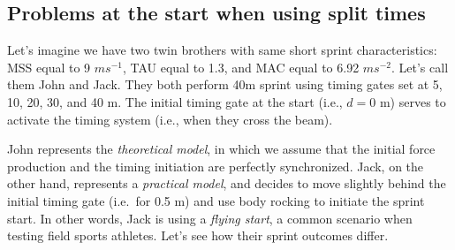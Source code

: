 \documentclass[fleqn,10pt,lineno]{wlpeerj} %
\begin{document}
\hypertarget{problems-at-the-start-when-using-split-times}{%
\subsection{Problems at the start when using split times}\label{problems-at-the-start-when-using-split-times}}

Let's imagine we have two twin brothers with same short sprint characteristics: MSS equal to 9 \(ms^{-1}\), TAU equal to 1.3, and MAC equal to 6.92 \(ms^{-2}\). Let's call them John and Jack. They both perform 40m sprint using timing gates set at 5, 10, 20, 30, and 40 m. The initial timing gate at the start (i.e., \(d=0\) m) serves to activate the timing system (i.e., when they cross the beam).

John represents the \emph{theoretical model}, in which we assume that the initial force production and the timing initiation are perfectly synchronized. Jack, on the other hand, represents a \emph{practical model}, and decides to move slightly behind the initial timing gate (i.e.~for 0.5 m) and use body rocking to initiate the sprint start. In other words, Jack is using a \emph{flying start}, a common scenario when testing field sports athletes. Let's see how their sprint outcomes differ.
\end{document}
